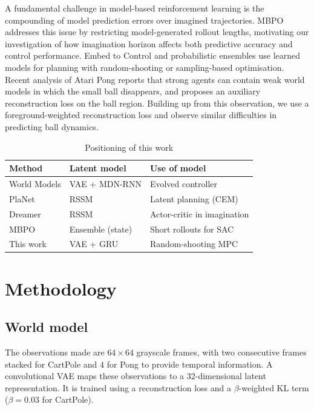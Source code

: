 \documentclass[conference]{IEEEtran}
\begin{document}
A fundamental challenge in model-based reinforcement learning is the compounding of model prediction errors over imagined trajectories. MBPO \cite{janner2019} addresses this issue by restricting model-generated rollout lengths, motivating our investigation of how imagination horizon affects both predictive accuracy and control performance. Embed to Control \cite{watter2015} and probabilistic ensembles \cite{chua2018} use learned models for planning with random-shooting or sampling-based optimisation. Recent analysis of Atari Pong \cite{pong2026} reports that strong agents can contain weak world models in which the small ball disappears, and proposes an auxiliary reconstruction loss on the ball region. Building up from this observation, we use a foreground-weighted reconstruction loss and observe similar difficulties in predicting ball dynamics.

\begin{table}[t]
\caption{Positioning of this work}
\label{tab:positioning}
\centering
\begin{tabular}{@{}lll@{}}
\toprule
Method & Latent model & Use of model \\
\midrule
World Models \cite{ha2018} & VAE + MDN-RNN & Evolved controller \\
PlaNet \cite{hafner2019} & RSSM & Latent planning (CEM) \\
Dreamer \cite{hafner2020} & RSSM & Actor-critic in imagination \\
MBPO \cite{janner2019} & Ensemble (state) & Short rollouts for SAC \\
This work & VAE + GRU & Random-shooting MPC \\
\bottomrule
\end{tabular}
\end{table}

\section{Methodology}
\subsection{World model}
The observations made are $64\times64$ grayscale frames, with two consecutive frames stacked for CartPole and 4 for Pong to provide temporal information. A convolutional VAE \cite{kingma2013} maps these observations to a 32-dimensional latent representation. It is trained using a reconstruction loss and a $\beta$-weighted KL term ($\beta{=}0.03$ for CartPole). 
\end{document}
